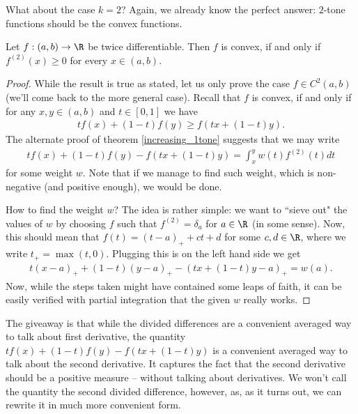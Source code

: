 What about the case $k = 2$? Again, we already know the perfect answer: $2$-tone functions should be the convex functions.

\begin{lause}\label{2-tone}
	Let $f : (a, b) \to \R$ be twice differentiable. Then $f$ is convex, if and only if $f^{(2)}(x) \geq 0$ for every $x \in (a, b)$.
\end{lause}

\begin{proof}
	While the result is true as stated, let us only prove the case $f \in C^{2}(a, b)$ (we'll come back to the more general case). Recall that $f$ is convex, if and only if for any $x, y \in (a, b)$ and $t \in [0, 1]$ we have
	\begin{align*}
		t f(x) + (1 - t) f(y) \geq f(t x + (1 - t)y).
	\end{align*}
	The alternate proof of theorem \ref{increasing_1tone} suggests that we may write
	\begin{align*}
		t f(x) + (1 - t) f(y) - f(t x + (1 - t)y) = \int_{x}^{y} w(t) f^{(2)}(t) dt
	\end{align*}
	for some weight $w$. Note that if we manage to find such weight, which is non-negative (and positive enough), we would be done.

	How to find the weight $w$? The idea is rather simple: we want to ``sieve out" the values of $w$ by choosing $f$ such that $f^{(2)} = \delta_{a}$ for $a \in \R$ (in some sense). Now, this should mean that $f(t) = (t - a)_{+} + c t + d$ for some $c, d \in \R$, where we write $t_{+} = \max(t, 0)$. Plugging this is on the left hand side we get
	\begin{align*}
		t (x - a)_{+} + (1 - t) (y - a)_{+} - (t x + (1 - t) y - a)_{+} = w(a).
	\end{align*}
	Now, while the steps taken might have contained some leaps of faith, it can be easily verified with partial integration that the given $w$ really works.
\end{proof}

The giveaway is that while the divided differences are a convenient averaged way to talk about first derivative, the quantity $tf(x) + (1 - t) f(y) - f(t x + (1 - t)y)$ is a convenient averaged way to talk about the second derivative. It captures the fact that the second derivative should be a positive measure -- without talking about derivatives. We won't call the quantity the second divided difference, however, as, as it turns out, we can rewrite it in much more convenient form.


